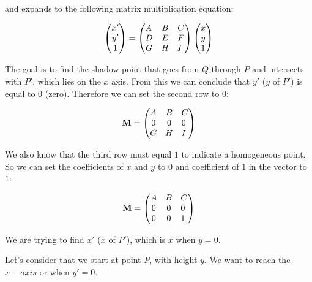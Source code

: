 \documentclass[12pt]{article}
\begin{document}
and expands to the following matrix multiplication equation:

\begin{align}
\begin{pmatrix}
x' \\
y' \\
1  
\end{pmatrix} \nonumber
&=
\begin{pmatrix}
A \hfill & B & C \\
D & E & F \hfill \\
G & H & I \hfill 
\end{pmatrix} \nonumber
\begin{pmatrix}
x \\
y \\
1  
\end{pmatrix} \nonumber \\
\end{align}


The goal is to find the shadow point that goes from $Q$ through $P$ 
and intersects with $P'$, which lies on the $x$ axis. 
From this we can conclude that $y'$ ($y$ of $P'$) is equal to 0 (zero).
Therefore we can set the second row to $0$:

\begin{align}
\textbf{M} &=
\begin{pmatrix}
A \hfill & B & C \\
0 & 0 & 0 \hfill \\
G & H & I \hfill 
\end{pmatrix} \nonumber \\
\end{align}

We also know that the third row must equal $1$ to indicate a homogeneous point.
So we can set the coefficients of $x$ and $y$ to $0$ and coefficient of $1$ in the vector to $1$:

\begin{align}
\textbf{M} &=
\begin{pmatrix}
A \hfill & B & C \\
0 & 0 & 0 \hfill \\
0 & 0 & 1 \hfill 
\end{pmatrix} \nonumber \\
\end{align}

We are trying to find $x'$ ($x$ of $P'$), which is $x$ when $y = 0$.

Let's consider that we start at point $P$, with height $y$. 
We want to reach the $x-axis$ or when $y' = 0$.
\end{document}
